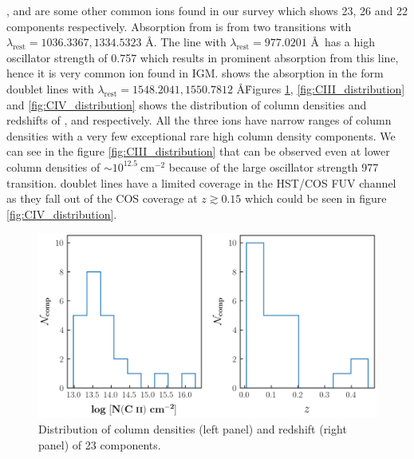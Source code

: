 ,  and  are some other common ions found in our survey which shows 23, 26 and 22 components respectively. Absorption from  is from two transitions with $\lambda_\text{rest}=1036.3367, 1334.5323$ \AA . The  line with $\lambda_\text{rest}=977.0201$ \AA \ has a high oscillator strength of 0.757 which results in prominent absorption from this line, hence it is very common ion found in IGM.  shows the absorption in the form doublet lines with $\lambda_\text{rest}=1548.2041, 1550.7812$ \AA \. Figures \ref{fig:CII_distribution}, \ref{fig:CIII_distribution} and \ref{fig:CIV_distribution} shows the distribution of column densities and redshifts of ,  and  respectively. All the three ions have narrow ranges of column densities with a very few exceptional rare high column density components. We can see in the figure \ref{fig:CIII_distribution} that  can be observed even at lower column densities of $\sim 10^{12.5} \ \text{cm}^{-2}$ because of the large oscillator strength  977 transition.  doublet lines have a limited coverage in the HST/COS FUV channel as they fall out of the COS coverage at $z \gtrsim 0.15$ which could be seen in figure \ref{fig:CIV_distribution}.



\begin{figure}
    \centering
    \includegraphics[width=\linewidth]{Figures/CII_distribution_survey.png}
    \caption{Distribution of column densities (left panel) and redshift (right panel) of 23  components.}
    \label{fig:CII_distribution}
\end{figure}

